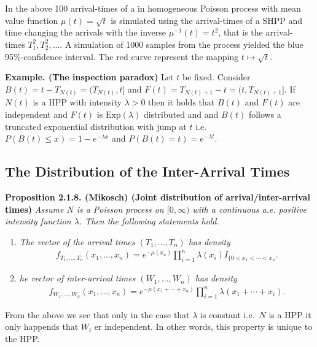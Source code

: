 \documentclass[a4paper,10pt,openany]{book}
\providecommand{\tightlist}{%
 \setlength{\itemsep}{0pt}\setlength{\parskip}{0pt}}
\begin{document}
In the above 100 arrival-times of a in homogeneous Poisson process with mean value function \(\mu(t)=\sqrt{t}\) is simulated using the arrival-times of a SHPP and time changing the arrivals with the inverse \(\mu^{-1}(t)=t^2\), that is the arrival- times \(T_1^2,T_2^2,...\). A simulation of 1000 samples from the process yielded the blue 95\%-confidence interval. The red curve represent the mapping \(t\mapsto \sqrt{t}\).

\textbf{Example. (The inspection paradox)} Let \(t\) be fixed. Consider \(B(t)=t-T_{N(t)}=(T_{N(t)},t]\) and \(F(t)=T_{N(t)+1}-t=(t,T_{N(t)+1}]\). If \(N(t)\) is a HPP with intensity \(\lambda>0\) then it holds that \(B(t)\) and \(F(t)\) are independent and \(F(t)\) is \(\text{Exp}(\lambda)\) distributed and and \(B(t)\) follows a truncated exponential distribution with jump at \(t\) i.e.~\(P(B(t)\le x)=1-e^{-\lambda x}\) and \(P(B(t)=t)=e^{-\lambda t}\).

\hypertarget{the-distribution-of-the-inter-arrival-times}{%
\subsection{The Distribution of the Inter-Arrival Times}\label{the-distribution-of-the-inter-arrival-times}}

\textbf{Proposition 2.1.8. (Mikosch) (Joint distribution of arrival/inter-arrival times)} \emph{Assume \(N\) is a Poisson process on \([0, \infty)\) with a continuous a.e. positive intensity function \(\lambda\). Then the following statements hold.}

\begin{enumerate}
\def\labelenumi{(\arabic{enumi})}
\tightlist
\item
  \emph{The vector of the arrival times \((T_1,...,T_n)\) has density}
  \begin{align*}
    f_{T_1,...,T_n}(x_1,...,x_n)=e^{-\mu(x_n)}\prod_{i=1}^n\lambda(x_i)I_{\{0<x_1<\cdots <x_n}.
    \end{align*}
\item
  \emph{he vector of inter-arrival times \((W_1,...,W_n)\) has density}
  \begin{align*}
    f_{W_1,...,W_n}(x_1,...,x_n)=e^{-\mu(x_1+\cdots+x_n)}\prod_{i=1}^n\lambda(x_1+\cdots +x_i).
    \end{align*}
\end{enumerate}

From the above we see that only in the case that \(\lambda\) is constant i.e.~\(N\) is a HPP it only happends that \(W_i\) er independent. In other words, this property is unique to the HPP.
\end{document}
